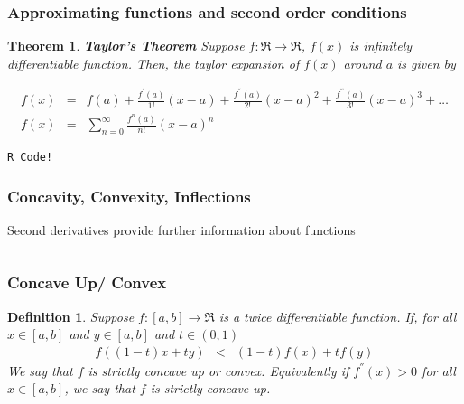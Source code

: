 \documentclass{beamer}
\newtheorem{thm}{Theorem}
\newtheorem{defn}{Definition}
\numberwithin{equation}{section}
\begin{document}
\begin{frame}
\frametitle{Approximating functions and second order conditions}


\begin{thm}
\textbf{Taylor's Theorem}
Suppose $f:\Re \rightarrow \Re$, $f(x)$ is infinitely differentiable function.  Then, the taylor expansion of $f(x)$ around \alert{$a$} is given by 

\begin{eqnarray}
f(x) & = & f(a) + \frac{f^{'}(a)}{1!} (x- a) + \frac{f^{''}(a)}{2!} (x - a)^2 + \frac{f^{'''}(a)}{3!}(x- a)^3 + \hdots \nonumber \\
f(x) & = & \sum_{n=0}^{\infty } \frac{f^{n} (a) }{n!} (x - a)^n \nonumber
\end{eqnarray}

\end{thm}


\end{frame}


\begin{frame}

{\tt R Code!}

\end{frame}




\begin{frame}
\frametitle{Concavity, Convexity, Inflections}
Second derivatives provide further information about functions 

\begin{columns}[]








\end{columns}


\end{frame}

\begin{frame}
\frametitle{Concave Up/ Convex}

\begin{defn} 
Suppose $f:[a,b]\rightarrow \Re$ is a \alert{twice} differentiable function.  If, for all $x \in [a,b]$ and $y \in [a,b]$ and $t \in (0,1)$
\begin{eqnarray}
f((1-t)x + t y) & < & (1-t) f(x) + t f(y) \nonumber 
\end{eqnarray} 
We say that $f$ is strictly \alert{concave up} or \alert{convex}.  Equivalently if $f^{''}(x)>0$ for all $x \in [a,b]$, we say that $f$ is strictly \alert{concave up}.  
\end{defn}

\end{frame}
\end{document}
